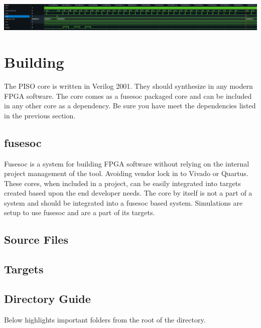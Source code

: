 \includegraphics[width=\textwidth]{img/diagrams/waveform_rev1.png}

\section{Building}

\par
The PISO core is written in Verilog 2001. They should synthesize in any modern FPGA software. The core comes as a fusesoc packaged core and can be included in any other core as a dependency. Be sure you have meet the dependencies listed in the previous section.

\subsection{fusesoc}
\par
Fusesoc is a system for building FPGA software without relying on the internal project management of the tool. Avoiding vendor lock in to Vivado or Quartus.
These cores, when included in a project, can be easily integrated into targets created based upon the end developer needs. The core by itself is not a part of
a system and should be integrated into a fusesoc based system. Simulations are setup to use fusesoc and are a part of its targets.

\subsection{Source Files}



\subsection{Targets}



\subsection{Directory Guide}

\par
Below highlights important folders from the root of the directory.

